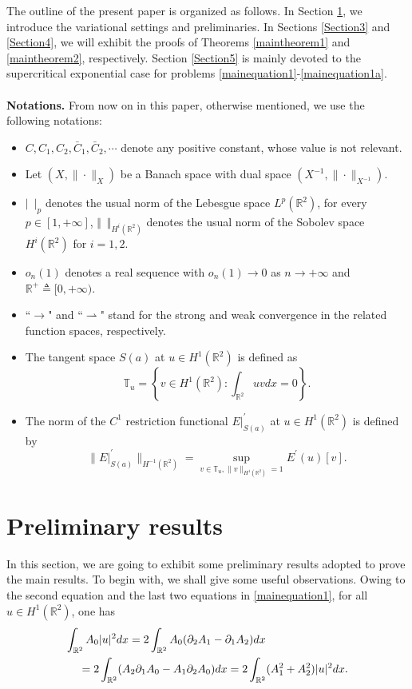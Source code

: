 \documentclass[11pt]{amsart}
\numberwithin{equation}{section}
\theoremstyle{definition}
\newcommand{\R}{\mathbb{R}}
\begin{document}
The outline of the present paper is organized as follows. In Section \ref{Section2}, we introduce the variational settings
and preliminaries. In Sections \ref{Section3} and \ref{Section4}, we will exhibit the proofs
of Theorems \ref{maintheorem1} and \ref{maintheorem2}, respectively. Section \ref{Section5}
is mainly devoted to the supercritical exponential case for problems \eqref{mainequation1}-\eqref{mainequation1a}.
\\\\
 \textbf{Notations.} From now on in this paper, otherwise mentioned, we use the following notations:
\begin{itemize}
	\item   $C,C_1,C_2,\bar{C}_1,\bar{C}_2,\cdots$ denote any positive constant, whose value is not relevant.
	 	\item      Let $(X,\|\cdot\|_X)$ be a Banach
space with dual space $(X^{-1},\|\cdot\|_{X^{-1}})$.
 \item  $|\,\,\,|_p$ denotes the usual norm of the Lebesgue space $L^{p}(\mathbb{R}^2)$, for every $p \in [1,+\infty]$,
	$\Vert\,\,\,\Vert_{H^{i}(\R^2)}$ denotes the usual norm of the Sobolev space $H^{i}(\mathbb{R}^2)$ for $i=1,2$.
\item $o_{n}(1)$ denotes a real sequence with $o_{n}(1)\to 0$ as $n \to +\infty$
and $\R^+\triangleq[0,+\infty)$.
\item ``$\to$" and ``$\rightharpoonup$" stand for the strong and weak convergence in the related function spaces, respectively.
\item The tangent space $S(a)$ at $u\in H^1(\R^2)$ is defined as
\[
\mathbb{T}_u=\left\{v\in H^1(\R^2):\int_{\R^2}uvdx=0\right\}.
\]
\item The norm of the $C^1$
restriction functional $E|_{S(a)}^\prime$ at $u\in H^1(\R^2)$ is defined by
\[
\|E|_{S(a)}^\prime\|_{ H^{-1}(\R^2) }=\sup_{v\in \mathbb{T}_u,\|v\|_{H^1(\R^2)}=1}E^\prime(u)[v].
\]
\end{itemize}




\section{Preliminary results}\label{Section2}

In this section, we are going to exhibit some preliminary results adopted to prove the main results.
To begin with, we shall give some useful observations. Owing to
 the second equation and the last two equations in \eqref{mainequation1}, for all $u\in
H^1(\mathbb{R}^2)$, one has
\begin{equation}\label{gauge0}
\begin{gathered}
\int_{\mathbb{R}^2}A_0|u|^2dx  =2\int_{\mathbb{R}^2}A_0(\partial_2A_1-\partial_1A_2)dx   \hfill\\
 \ \ \ \   =2\int_{\mathbb{R}^2}(A_2\partial_1A_0-A_1\partial_2A_0)dx
 =2\int_{\mathbb{R}^2}(A_1^2+A_2^2)|u|^2dx.\hfill\\
\end{gathered}
\end{equation}
\end{document}
